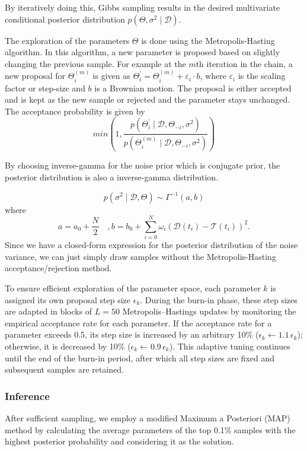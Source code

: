 By iteratively doing this, Gibbs sampling results in the desired multivariate conditional posterior distribution $p(\Theta,\sigma^2 \mid \mathcal{D})$.

The exploration of the parameters $\Theta$ is done using the Metropolis-Hasting algorithm.
In this algorithm, a new parameter is proposed based on slightly changing the previous sample.
For example at the $m$th iteration in the chain, a new proposal for $\Theta_{i}^{(m)}$ is given as $\Theta_{i}^\prime = \Theta_{i}^{(m)} + \varepsilon_{i} \cdot b$, where $\varepsilon_{i}$ is the scaling factor or step-size and $b$ is a Brownian motion.
The proposal is either accepted and is kept as the new sample or rejected and the parameter stays unchanged.
The acceptance probability is given by
\[
	min\left(1,\frac{p(\Theta_i^\prime \mid \mathcal{D}, \Theta_{-i}, \sigma^2)}{p(\Theta_i^{(m)}\mid \mathcal{D}, \Theta_{-i}, \sigma^2)}\right)
\]

By choosing inverse-gamma for the noise prior which is conjugate prior, the posterior distribution is also a inverse-gamma distribution.

\[
	p(\sigma^2 \mid \mathcal{D},\Theta) \sim \Gamma^{-1}(a, b)
\]
where
\[
	a=a_0 + \frac{N}{2} \quad, b= b_0 + \sum_{i=0}^N \omega_i(\mathcal{D}(t_i) - \mathcal{T}(t_i))^2.
\]
Since we have a closed-form expression for the posterior distribution of the noise variance, we can just simply draw samples without the Metropolis-Hasting acceptance/rejection method.

To ensure efficient exploration of the parameter space, each parameter \( k \) is assigned its own proposal step size \( \epsilon_k \).
During the burn-in phase, these step sizes are adapted in blocks of \( L = 50 \) Metropolis–Hastings updates by monitoring the empirical acceptance rate for each parameter.
If the acceptance rate for a parameter exceeds 0.5, its step size is increased by an arbitrary 10\% (\( \epsilon_k \leftarrow 1.1\,\epsilon_k \)); otherwise, it is decreased by 10\% (\( \epsilon_k \leftarrow 0.9\,\epsilon_k \)).
This adaptive tuning continues until the end of the burn-in period, after which all step sizes are fixed and subsequent samples are retained.

\subsubsection{Inference}
After sufficient sampling, we employ a modified Maximum a Posteriori (MAP) method by calculating the average parameters of the top 0.1\% samples with the highest posterior probability and considering it as the solution.



